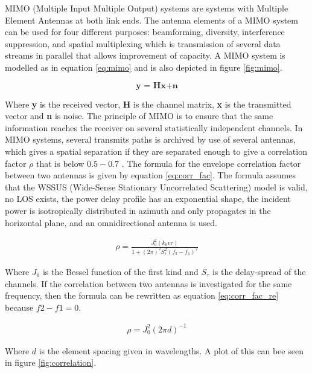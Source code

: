MIMO (Multiple Input Multiple Output) systems are systems with Multiple Element Antennas at both link ends. The antenna elements of a MIMO system can be used for four different purposes: beamforming, diversity, interference suppression, and spatial multiplexing which is transmission of several data streams in parallel that allows improvement of capacity.\citep{molisch2011} A MIMO system is modelled as in equation \ref{eq:mimo} and is also depicted in figure \ref{fig:mimo}.

\begin{equation}\label{eq:mimo}
\textbf{y = Hx+n}
\end{equation}  

Where \textbf{y} is the received vector, \textbf{H} is the channel matrix, \textbf{x} is the transmitted vector and \textbf{n} is noise. The principle of MIMO is to ensure that the same information reaches the receiver on several
statistically independent channels. In MIMO systems, several transmits paths is archived by use of several antennas, which gives a spatial separation if they are separated enough to give a correlation factor $\rho$ that is below $0.5 - 0.7$ \citep{molisch2011}. The formula for the envelope correlation factor between two antennas is given by equation \ref{eq:corr_fac}. The formula assumes that the WSSUS (Wide-Sense Stationary Uncorrelated Scattering) model is valid, no LOS exists, the power delay profile has an exponential shape, the incident power is isotropically distributed in azimuth and only propagates in the horizontal plane, and an omnidirectional antenna is used.

\begin{eqnarray} \label{eq:corr_fac}
\rho = \frac{J_0^2( k_0 v \tau)}{1+(2\pi)^2 S_\tau^2(f_2 - f_1)^2 }
\end{eqnarray}      

Where $J_0$ is the Bessel function of the first kind and $S_\tau$ is the delay-spread of the channels. If the correlation between two antennas is investigated for the same frequency, then the formula can be rewritten as equation \ref{eq:corr_fac_re} because $f2-f1=0$.

\begin{eqnarray} \label{eq:corr_fac_re}
\rho = J_0^2( 2\pi d)^{-1}
\end{eqnarray} 

Where $d$ is the element spacing given in wavelengths. A plot of this can bee seen in figure \ref{fig:correlation}.

